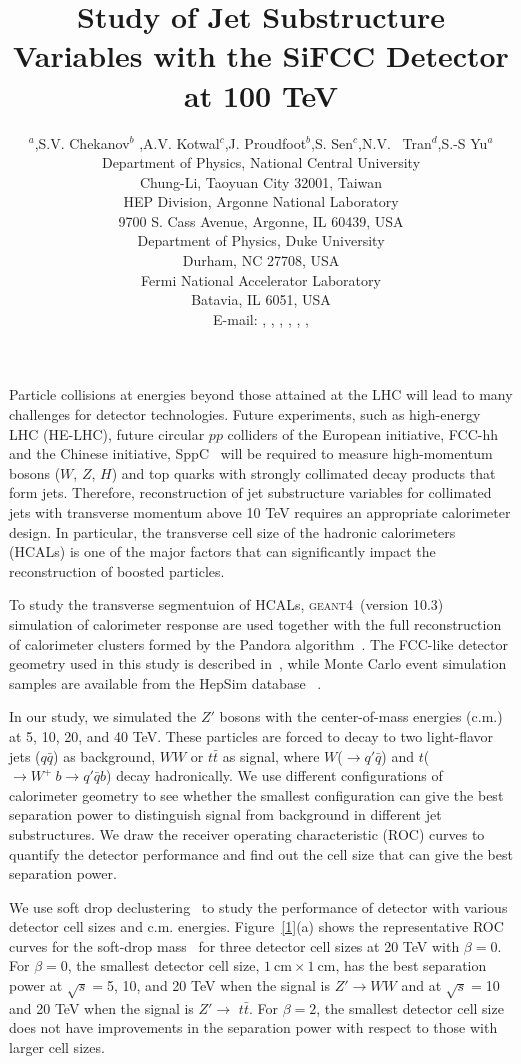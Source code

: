\documentclass[a4paper]{PoS}
\title{Study of Jet Substructure Variables with the SiFCC Detector at 100 TeV}
\author{\speaker{C.-H Yeh}$^a$,S.V. Chekanov$^b$ ,A.V. Kotwal$^{c}$,J. Proudfoot$^{b}$,S. Sen$^{c}$,N.V. ~Tran$^{d}$,S.-S Yu$^{a}$\\     
     \llap{$^a$}Department of Physics, National Central University\\
     Chung-Li, Taoyuan City 32001, Taiwan\\
     \llap{$^b$}HEP Division, Argonne National Laboratory\\
     9700 S. Cass Avenue, Argonne, IL 60439, USA\\
     \llap{$^c$}Department of Physics, Duke University\\
     Durham, NC 27708, USA\\
     \llap{$^d$}Fermi National Accelerator Laboratory\\
     Batavia, IL 6051, USA\\
     E-mail:  \email{a9510130375@gmail.com},
     \email{chekanov@anl.gov},
     \email{kotwal@phy.duke.edu},
     \email{sourav.sen@duke.edu},
     \email{ntran@fnal.gov},
     \email{proudfoot@anl.gov},
     \email{syu@phy.ncu.edu.tw}}
\newcommand{\GEANTfour} {\textsc{geant4}}
\begin{document}
Particle collisions at energies  beyond those attained at the LHC will lead to many 
challenges for detector technologies.
Future experiments, such as high-energy LHC (HE-LHC),
future circular $pp$ colliders of the European initiative, FCC-hh~\cite{Benedikt:2206376} and the Chinese initiative, SppC~\cite{Tang:2015qga} will be required to measure high-momentum bosons ($W$, $Z$, $H$) and top quarks with strongly
collimated decay products that form jets.  
Therefore, reconstruction of jet substructure  variables for collimated jets with transverse 
momentum above 10 TeV
requires an appropriate calorimeter design.  In particular, the transverse cell size of the hadronic 
calorimeters  (HCALs) is one of the major factors that can significantly impact 
the reconstruction of boosted particles.

To study the transverse segmentuion of HCALs,
\GEANTfour\ (version 10.3) ~\cite{Allison:2016} simulation of calorimeter response are used together
with the full reconstruction of calorimeter clusters formed by the Pandora algorithm~\cite{Marshall:2013,Charles:2009ta}.
The FCC-like detector geometry used in this study is described in~\cite{Chekanov:2016ppq},
while Monte Carlo event simulation samples are available from the
HepSim database ~\cite{Chekanov:2014fga}.

In our study, we simulated the $Z'$ bosons with the center-of-mass energies (c.m.) at 5, 10, 20, and 40 TeV. These particles are forced to decay to two light-flavor jets ($q\bar{q}$) as background, $W W$ or $t\bar{t}$ as signal, where $W$($\rightarrow$$q'\bar{q}$) and $t$($ \rightarrow  W^+\>b \rightarrow q'\bar{q} b$) decay hadronically. We use different configurations of calorimeter geometry to see whether the smallest configuration can give the best separation power to distinguish signal from background in different jet substructures. We draw the receiver operating characteristic (ROC) curves to quantify the detector performance and find out the cell size that can give the best separation power.

We use soft drop declustering~\cite{Larkoski:2014wba} to study the performance of detector with various detector cell sizes and c.m. energies. Figure~\ref{1}(a) shows the representative ROC curves for the soft-drop mass~\cite{Larkoski:2014wba} for three detector cell sizes at 20 TeV with $\beta=0$. For $\beta=0$, the smallest detector cell size, $1~\mathrm{cm}\times1~\mathrm{cm}$, has the best separation power at $\sqrt{s}=$5, 10, and 20 TeV when the signal is $Z' \rightarrow WW$ and at $\sqrt{s}=$10 and 20 TeV when the signal is $Z' \rightarrow$ $t\bar{t}$. For $\beta=2$, the smallest detector cell size does not have improvements in the separation power with respect to those with larger cell sizes.
\end{document}

